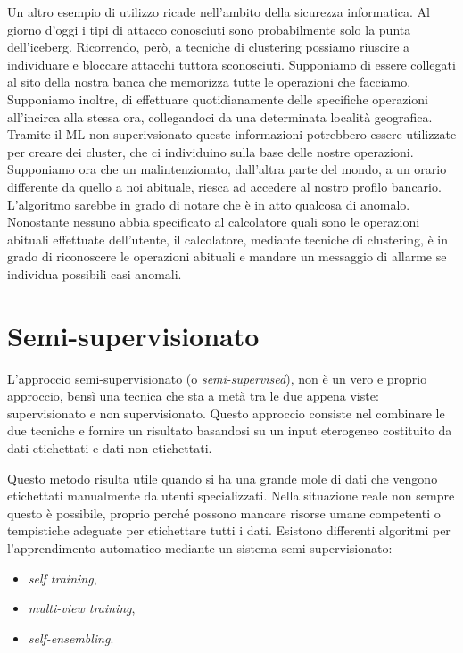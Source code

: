 \documentclass[12pt,italian]{report}
\begin{document}
Un altro esempio di utilizzo ricade nell'ambito della sicurezza informatica. Al giorno d'oggi i tipi di attacco conosciuti sono probabilmente solo la punta dell'iceberg. Ricorrendo, però, a tecniche di clustering possiamo riuscire a individuare e bloccare attacchi tuttora sconosciuti. 
Supponiamo di essere collegati al sito della nostra banca che memorizza tutte le operazioni che facciamo. Supponiamo inoltre, di effettuare quotidianamente delle specifiche operazioni all'incirca alla stessa ora, collegandoci da una determinata località geografica. Tramite il ML non superivsionato queste informazioni potrebbero essere utilizzate per creare dei cluster, che ci individuino sulla base delle nostre operazioni.
Supponiamo ora che un malintenzionato, dall'altra parte del mondo, a un orario differente da quello a noi abituale, riesca ad accedere al nostro profilo bancario. L'algoritmo sarebbe in grado di notare che è in atto qualcosa di anomalo. Nonostante nessuno abbia specificato al calcolatore quali sono le operazioni abituali effettuate dell'utente, il calcolatore, mediante tecniche di clustering, è in grado di riconoscere le operazioni abituali e mandare un messaggio di allarme se individua possibili casi anomali.

\section{Semi-supervisionato}

L'approccio semi-supervisionato (o \emph{semi-supervised}), non è un vero e proprio approccio, bensì una tecnica che sta a metà tra le due appena viste: supervisionato e non supervisionato. Questo approccio consiste nel combinare le due tecniche e fornire un risultato basandosi su un input eterogeneo costituito da dati etichettati e dati non etichettati.

Questo metodo risulta utile quando si ha una grande mole di dati che vengono etichettati manualmente da utenti specializzati. Nella situazione reale non sempre questo è possibile, proprio perché possono mancare risorse umane competenti o tempistiche adeguate per etichettare tutti i dati. Esistono differenti algoritmi per l'apprendimento automatico mediante un sistema semi-supervisionato:
\begin{itemize}
	\item \emph{self training},
	\item \emph{multi-view training},
	\item \emph{self-ensembling}.
\end{itemize}
\end{document}
